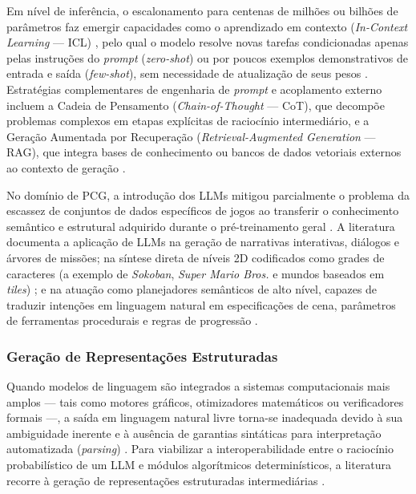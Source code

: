 Em nível de inferência, o escalonamento para centenas de milhões ou bilhões de parâmetros faz emergir capacidades como o aprendizado em contexto (\textit{In-Context Learning} --- ICL) \cite{ocal2024sceneteller, her2025zeroshot3dmapgeneration}, pelo qual o modelo resolve novas tarefas condicionadas apenas pelas instruções do \textit{prompt} (\textit{zero-shot}) ou por poucos exemplos demonstrativos de entrada e saída (\textit{few-shot}), sem necessidade de atualização de seus pesos \cite{Gallotta_2024, ocal2024sceneteller, her2025zeroshot3dmapgeneration}. Estratégias complementares de engenharia de \textit{prompt} e acoplamento externo incluem a Cadeia de Pensamento (\textit{Chain-of-Thought} --- CoT), que decompõe problemas complexos em etapas explícitas de raciocínio intermediário, e a Geração Aumentada por Recuperação (\textit{Retrieval-Augmented Generation} --- RAG), que integra bases de conhecimento ou bancos de dados vetoriais externos ao contexto de geração \cite{Gallotta_2024, tang2025unrealllm, her2025zeroshot3dmapgeneration, wang2026designerlyloop}.

No domínio de PCG, a introdução dos LLMs mitigou parcialmente o problema da escassez de conjuntos de dados específicos de jogos ao transferir o conhecimento semântico e estrutural adquirido durante o pré-treinamento geral \cite{Gallotta_2024, todd2023level, maleki2024procedural}. A literatura documenta a aplicação de LLMs na geração de narrativas interativas, diálogos e árvores de missões; na síntese direta de níveis 2D codificados como grades de caracteres (a exemplo de \textit{Sokoban}, \textit{Super Mario Bros.} e mundos baseados em \textit{tiles}) \cite{todd2023level, nasir2024word2worldgeneratingstoriesworlds, maleki2024procedural}; e na atuação como planejadores semânticos de alto nível, capazes de traduzir intenções em linguagem natural em especificações de cena, parâmetros de ferramentas procedurais e regras de progressão \cite{Gallotta_2024, hu2024scenecraft, tang2025unrealllm, xu2025constraint, her2025zeroshot3dmapgeneration}.

\subsubsection{Geração de Representações Estruturadas}
\label{sec:representacoes_estruturadas}

Quando modelos de linguagem são integrados a sistemas computacionais mais amplos --- tais como motores gráficos, otimizadores matemáticos ou verificadores formais ---, a saída em linguagem natural livre torna-se inadequada devido à sua ambiguidade inerente e à ausência de garantias sintáticas para interpretação automatizada (\textit{parsing}) \cite{xu2025constraint, regmi2025system}. Para viabilizar a interoperabilidade entre o raciocínio probabilístico de um LLM e módulos algorítmicos determinísticos, a literatura recorre à geração de representações estruturadas intermediárias \cite{hu2024scenecraft, tang2025unrealllm, xu2025constraint, chen2025narrative, wang2026designerlyloop}.

